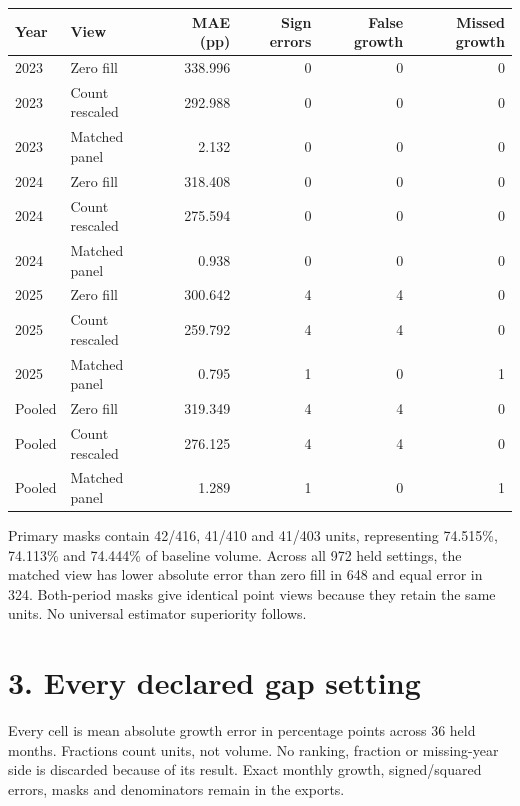 \documentclass[11pt]{article}
\begin{document}
\begin{center}\small\setlength{\tabcolsep}{4pt}
\begin{tabular}{llrrrr}\toprule
Year & View & MAE (pp) & Sign errors & False growth & Missed growth \\
\midrule
2023 & Zero fill & 338.996 & 0 & 0 & 0 \\
2023 & Count rescaled & 292.988 & 0 & 0 & 0 \\
2023 & Matched panel & 2.132 & 0 & 0 & 0 \\
2024 & Zero fill & 318.408 & 0 & 0 & 0 \\
2024 & Count rescaled & 275.594 & 0 & 0 & 0 \\
2024 & Matched panel & 0.938 & 0 & 0 & 0 \\
2025 & Zero fill & 300.642 & 4 & 4 & 0 \\
2025 & Count rescaled & 259.792 & 4 & 4 & 0 \\
2025 & Matched panel & 0.795 & 1 & 0 & 1 \\
Pooled & Zero fill & 319.349 & 4 & 4 & 0 \\
Pooled & Count rescaled & 276.125 & 4 & 4 & 0 \\
Pooled & Matched panel & 1.289 & 1 & 0 & 1 \\
\bottomrule\end{tabular}\end{center}
Primary masks contain 42/416, 41/410 and 41/403 units, representing 74.515\%, 74.113\% and 74.444\% of baseline volume. Across all 972 held settings, the matched view has lower absolute error than zero fill in 648 and equal error in 324. Both-period masks give identical point views because they retain the same units. No universal estimator superiority follows.

\newpage\section*{3. Every declared gap setting}
Every cell is mean absolute growth error in percentage points across 36 held months. Fractions count units, not volume. No ranking, fraction or missing-year side is discarded because of its result. Exact monthly growth, signed/squared errors, masks and denominators remain in the exports.
\end{document}
